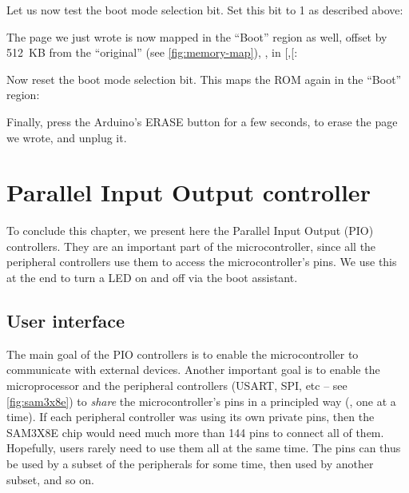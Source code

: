 
Let us now test the boot mode selection bit. Set this bit to 1 as described
above:


\noindent The page we just wrote is now mapped in the ``Boot'' region as well,
offset by 512~KB from the ``original'' (see \cref{fig:memory-map}), \ie, in
[,[:


\noindent Now reset the boot mode selection bit. This maps the ROM again in the
``Boot'' region:


\noindent Finally, press the Arduino's ERASE button for a few seconds, to erase
the page we wrote, and unplug it.

\section{Parallel Input Output controller}\label{section:pio}

To conclude this chapter, we present here the Parallel Input Output (PIO)
controllers. They are an important part of the microcontroller, since all the
peripheral controllers use them to access the microcontroller's pins. We use
this at the end to turn a LED on and off via the boot assistant.

\subsection{User interface}

The main goal of the PIO controllers is to enable the microcontroller to
communicate with external devices. Another important goal is to enable the
microprocessor and the peripheral controllers (USART, SPI, etc -- see
\cref{fig:sam3x8e}) to {\em share} the microcontroller's pins in a principled
way (\ie, one at a time). If each peripheral controller was using its own
private pins, then the SAM3X8E chip would need much more than 144 pins to
connect all of them. Hopefully, users rarely need to use them all at the same
time. The pins can thus be used by a subset of the peripherals for some time,
then used by another subset, and so on.

